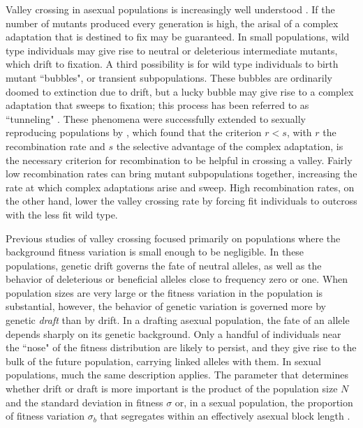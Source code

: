 \documentclass[rmp]{revtex4}
\begin{document}
Valley crossing in asexual populations is increasingly well understood \citep{weissman_2009}.
If the number of mutants produced every generation is high, the arisal of a complex adaptation that is destined to fix may be guaranteed.
In small populations, wild type individuals may give rise to neutral or deleterious intermediate mutants, which drift to fixation.
A third possibility is for wild type individuals to birth mutant ``bubbles", or transient subpopulations.
These bubbles are ordinarily doomed to extinction due to drift, but a lucky bubble may give rise to a complex adaptation that sweeps to fixation; this process has been referred to as ``tunneling" \citep{iwasa_2004, weissman_2009}.
These phenomena were successfully extended to sexually reproducing populations by \citet{weissman_2010}, which found that the criterion $r < s$, with $r$ the recombination rate and $s$ the selective advantage of the complex adaptation, is the necessary criterion for recombination to be helpful in crossing a valley.
Fairly low recombination rates can bring mutant subpopulations together, increasing the rate at which complex adaptations arise and sweep.
High recombination rates, on the other hand, lower the valley crossing rate by forcing fit individuals to outcross with the less fit wild type.

Previous studies of valley crossing focused primarily on populations where the background fitness variation is small enough to be negligible.
In these populations, genetic drift governs the fate of neutral alleles, as well as the behavior of deleterious or beneficial alleles close to frequency zero or one.
When population sizes are very large or the fitness variation in the population is substantial, however, the behavior of genetic variation is governed more by genetic \emph{draft} than by drift.
In a drafting asexual population, the fate of an allele depends sharply on its genetic background.
Only a handful of individuals near the ``nose" of the fitness distribution are likely to persist, and they give rise to the bulk of the future population, carrying linked alleles with them.
In sexual populations, much the same description applies.
The parameter that determines whether drift or draft is more important is the product of the population size $N$ and the standard deviation in fitness $\sigma$ \citep{neher_hallatschek_2013} or, in a sexual population, the proportion of fitness variation $\sigma_b$ that segregates within an effectively asexual block length \citep{neher_kessinger_2013}.
\end{document}
